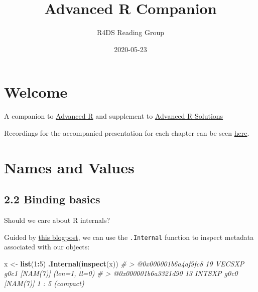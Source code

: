 \documentclass[]{book}
\title{Advanced R Companion}
\author{R4DS Reading Group}
\date{2020-05-23}
\newenvironment{Shaded}{\begin{snugshade}}{\end{snugshade}}
\newcommand{\CommentTok}[1]{\textcolor[rgb]{0.56,0.35,0.01}{\textit{#1}}}
\newcommand{\DecValTok}[1]{\textcolor[rgb]{0.00,0.00,0.81}{#1}}
\newcommand{\KeywordTok}[1]{\textcolor[rgb]{0.13,0.29,0.53}{\textbf{#1}}}
\newcommand{\NormalTok}[1]{#1}
\newcommand{\OperatorTok}[1]{\textcolor[rgb]{0.81,0.36,0.00}{\textbf{#1}}}
\newcommand{\StringTok}[1]{\textcolor[rgb]{0.31,0.60,0.02}{#1}}
\begin{document}
\maketitle

{
\setcounter{tocdepth}{1}
\tableofcontents
}
\hypertarget{welcome}{%
\chapter{Welcome}\label{welcome}}

A companion to \href{https://adv-r.hadley.nz/rcpp.html\#acknowledgments}{Advanced R} and supplement to \href{https://advanced-r-solutions.rbind.io/names-and-values.html\#copy-on-modify}{Advanced R Solutions}

Recordings for the accompanied presentation for each chapter can be seen \href{https://www.youtube.com/watch?v=pQ-xDAPEQaw\&list=PL3x6DOfs2NGi9lH7q-phZlPrl6HKXYDbn}{here}.

\hypertarget{names-and-values}{%
\chapter{Names and Values}\label{names-and-values}}

\hypertarget{binding-basics}{%
\section*{2.2 Binding basics}\label{binding-basics}}

Should we care about R internals?

Guided by \href{https://www.brodieg.com/2019/02/18/an-unofficial-reference-for-internal-inspect/}{this blogpost}, we can use the \texttt{.Internal} function to inspect metadata associated with our objects:

\begin{Shaded}
\begin{Highlighting}[]
\NormalTok{ x <-}\StringTok{ }\KeywordTok{list}\NormalTok{(}\DecValTok{1}\OperatorTok{:}\DecValTok{5}\NormalTok{)}
\KeywordTok{.Internal}\NormalTok{(}\KeywordTok{inspect}\NormalTok{(x))}
\CommentTok{# > @0x000001b6a4af9fc8 19 VECSXP g0c1 [NAM(7)] (len=1, tl=0)}
\CommentTok{# > @0x000001b6a3321d90 13 INTSXP g0c0 [NAM(7)]  1 : 5 (compact)}
\end{Highlighting}
\end{Shaded}
\end{document}
